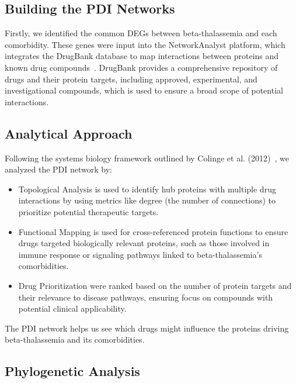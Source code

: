 \subsection*{Building the PDI Networks}

Firstly, we identified the common DEGs between beta-thalassemia and each comorbidity. These genes were input into the NetworkAnalyst platform, which integrates the DrugBank database to map interactions between proteins and known drug compounds~\cite{pdi_ref1}. DrugBank provides a comprehensive repository of drugs and their protein targets, including approved, experimental, and investigational compounds, which is used to ensure a broad scope of potential interactions.

\subsection*{Analytical Approach}

Following the systems biology framework outlined by Colinge et al. (2012)~\cite{pdi_colinge}, we analyzed the PDI network by:
\begin{itemize}
    \item Topological Analysis is used to identify hub proteins with multiple drug interactions by using metrics like degree (the number of connections) to prioritize potential therapeutic targets.
    \item Functional Mapping is used for cross-referenced protein functions to ensure drugs targeted biologically relevant proteins, such as those involved in immune response or signaling pathways linked to beta-thalassemia’s comorbidities.
    \item Drug Prioritization were ranked based on the number of protein targets and their relevance to disease pathways, ensuring focus on compounds with potential clinical applicability.
\end{itemize}
The PDI network helps us see which drugs might influence the proteins driving beta-thalassemia and its comorbidities.

\vspace*{-\parskip}
\subsection{Phylogenetic Analysis}
\label{sec:phylogenetic}

